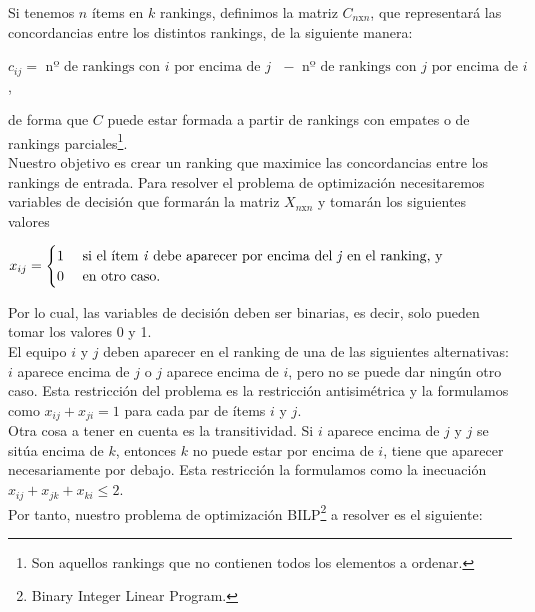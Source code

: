 Si tenemos $n$ ítems en $k$ rankings, definimos la matriz $C_{n \text{x} n}$, que representará las concordancias entre los distintos rankings, de la siguiente manera:
\begin{center}
	$c_{ij} = \text{ nº de rankings con }i \text{ por encima de } j \text{ } -  \text{ nº de rankings con }j \text{ por encima de } i \text{ }$,
\end{center}

de forma que $C$ puede estar formada a partir de rankings con empates o de rankings parciales\footnote{Son aquellos rankings que no contienen todos los elementos a ordenar.}.\\

Nuestro objetivo es crear un ranking que maximice las concordancias entre los rankings de entrada. Para resolver el problema de optimización necesitaremos variables de decisión que formarán la matriz $X_{n \text{x} n}$ y tomarán los siguientes valores
\begin{center}
	$ x_{ij} =  \begin{cases}
1 & \text{ si el ítem \textit{i} debe aparecer por encima del \textit{j} en el ranking, y} \\
0 & \text{ en otro caso. } 
\end{cases}$
\end{center}
Por lo cual, las variables de decisión deben ser binarias, es decir, solo pueden tomar los valores 0 y 1.\\

El equipo $i$ y $j$ deben aparecer en el ranking de una de las siguientes alternativas: $i$ aparece encima de $j$ o $j$ aparece encima de $i$, pero no se puede dar ningún otro caso. Esta restricción del problema es la restricción antisimétrica y la formulamos como $x_{ij} + x_{ji} = 1$ para cada par de ítems $i$ y $j$.\\

Otra cosa a tener en cuenta es la transitividad. Si $i$ aparece encima de $j$ y $j$ se sitúa encima de $k$, entonces $k$ no puede estar por encima de $i$, tiene que aparecer necesariamente por debajo. Esta restricción la formulamos como la inecuación $x_{ij} + x_{jk} + x_{ki} \leq 2$.\\


Por tanto, nuestro problema de optimización BILP\footnote{Binary Integer Linear Program.} a resolver es el siguiente:\\

